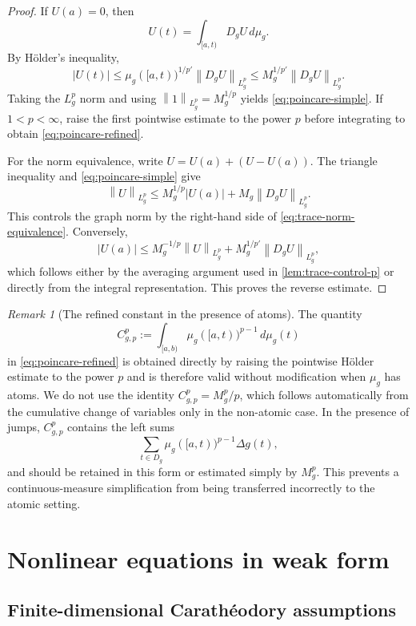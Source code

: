 \documentclass[preprint,12pt]{elsarticle}
\theoremstyle{definition}
\theoremstyle{remark}
\newtheorem{remark}[theorem]{Remark}
\newcommand{\norm}[1]{\left\lVert#1\right\rVert}
\newcommand{\abs}[1]{\left\lvert#1\right\rvert}
\begin{document}
\begin{proof}
If $U(a)=0$, then
\[
 U(t)=\int_{[a,t)}D_gU\,d\mu_g.
\]
By H\"older's inequality,
\[
 \abs{U(t)}
 \le \mu_g([a,t))^{1/p'}\norm{D_gU}_{L_g^p}
 \le M_g^{1/p'}\norm{D_gU}_{L_g^p}.
\]
Taking the $L_g^p$ norm and using $\norm{1}_{L_g^p}=M_g^{1/p}$ yields \eqref{eq:poincare-simple}. If $1<p<\infty$, raise the first pointwise estimate to the power $p$ before integrating to obtain \eqref{eq:poincare-refined}.

For the norm equivalence, write $U=U(a)+(U-U(a))$. The triangle inequality and \eqref{eq:poincare-simple} give
\[
 \norm{U}_{L_g^p}
 \le M_g^{1/p}\abs{U(a)}+M_g\norm{D_gU}_{L_g^p}.
\]
This controls the graph norm by the right-hand side of \eqref{eq:trace-norm-equivalence}. Conversely,
\[
 \abs{U(a)}
 \le M_g^{-1/p}\norm{U}_{L_g^p}+M_g^{1/p'}\norm{D_gU}_{L_g^p},
\]
which follows either by the averaging argument used in \cref{lem:trace-control-p} or directly from the integral representation. This proves the reverse estimate.
\end{proof}

\begin{remark}[The refined constant in the presence of atoms]\label{rem:poincare-atoms}
The quantity
\[
 C_{g,p}^p:=\int_{[a,b)}\mu_g([a,t))^{p-1}\,d\mu_g(t)
\]
in \eqref{eq:poincare-refined} is obtained directly by raising the pointwise H\"older estimate to the power $p$ and is therefore valid without modification when $\mu_g$ has atoms. We do not use the identity $C_{g,p}^p=M_g^p/p$, which follows automatically from the cumulative change of variables only in the non-atomic case. In the presence of jumps, $C_{g,p}^p$ contains the left sums
\[
 \sum_{t\in D_g}\mu_g([a,t))^{p-1}\Delta g(t),
\]
and should be retained in this form or estimated simply by $M_g^p$. This prevents a continuous-measure simplification from being transferred incorrectly to the atomic setting.
\end{remark}

\section{Nonlinear equations in weak form}\label{sec:nonlinear}

\subsection{Finite-dimensional Carath\'eodory assumptions}
\end{document}
